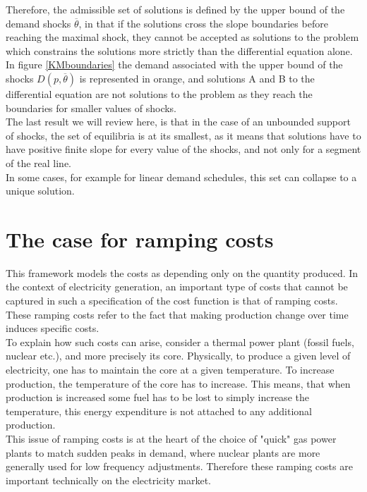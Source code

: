 Therefore, the admissible set of solutions is defined by the upper bound of the demand shocks $\overline{\theta}$, in that if the solutions cross the slope boundaries before reaching the maximal shock, they cannot be accepted as solutions to the problem which constrains the solutions more strictly than the differential equation alone. In figure \ref{KMboundaries} the demand associated with the upper bound of the shocks $D(p,\overline{\theta})$ is represented in orange, and solutions A and B to the differential equation are not solutions to the problem as they reach the boundaries for smaller values of shocks.\\

The last result we will review here, is that in the case of an unbounded support of shocks, the set of equilibria is at its smallest, as it means that solutions have to have positive finite slope for every value of the shocks, and not only for a segment of the real line. \\

In some cases, for example for linear demand schedules, this set can collapse to a unique solution. \\

\section*{The case for ramping costs}

This framework models the costs as depending only on the quantity produced. In the context of electricity generation, an important type of costs that cannot be captured in such a specification of the cost function is that of ramping costs. These ramping costs refer to the fact that making production change over time induces specific costs.\\

To explain how such costs can arise, consider a thermal power plant (fossil fuels, nuclear etc.), and more precisely its core. Physically, to produce a given level of electricity, one has to maintain the core at a given temperature. To increase production, the temperature of the core has to increase. This means, that when production is increased some fuel has to be lost to simply increase the temperature, this energy expenditure is not attached to any additional production.\\

This issue of ramping costs is at the heart of the choice of "quick" gas power plants to match sudden peaks in demand, where nuclear plants are more generally used for low frequency adjustments. Therefore these ramping costs are important technically on the electricity market. \\

